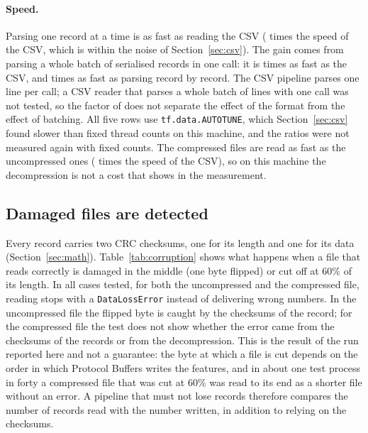\paragraph{Speed.} Parsing one record at a time is as fast as reading the CSV ( times the speed of the CSV, which is within the noise of Section~\ref{sec:csv}). The gain comes from parsing a whole batch of serialised records in one call: it is  times as fast as the CSV, and  times as fast as parsing record by record. The CSV pipeline parses one line per call; a CSV reader that parses a whole batch of lines with one call was not tested, so the factor of  does not separate the effect of the format from the effect of batching. All five rows use \texttt{tf.data.AUTOTUNE}, which Section~\ref{sec:csv} found slower than fixed thread counts on this machine, and the ratios were not measured again with fixed counts. The compressed files are read as fast as the uncompressed ones ( times the speed of the CSV), so on this machine the decompression is not a cost that shows in the measurement.

\subsection{Damaged files are detected}

Every record carries two CRC checksums, one for its length and one for its data (Section~\ref{sec:math}). Table~\ref{tab:corruption} shows what happens when a file that reads correctly is damaged in the middle (one byte flipped) or cut off at 60\% of its length. In all  cases tested, for both the uncompressed and the compressed file, reading stops with a \texttt{DataLossError} instead of delivering wrong numbers. In the uncompressed file the flipped byte is caught by the checksums of the record; for the compressed file the test does not show whether the error came from the checksums of the records or from the decompression. This is the result of the run reported here and not a guarantee: the byte at which a file is cut depends on the order in which Protocol Buffers writes the features, and in about one test process in forty a compressed file that was cut at 60\% was read to its end as a shorter file without an error. A pipeline that must not lose records therefore compares the number of records read with the number written, in addition to relying on the checksums.

\begin{table}[!htbp]
\centering
\small

\caption{Reading an intact and a damaged shard of 620 records.}
\label{tab:corruption}
\end{table}

